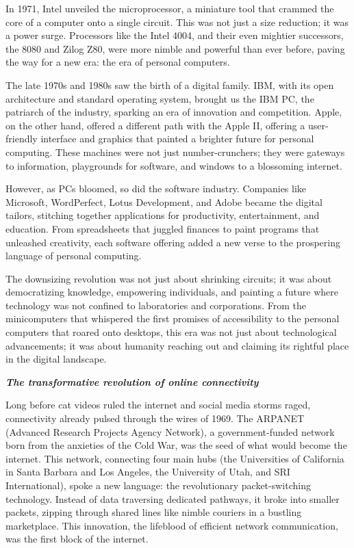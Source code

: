 \documentclass[
  letterpaper,
  DIV=11,
  numbers=noendperiod]{scrreprt}
\begin{document}
In 1971, Intel unveiled the microprocessor, a miniature tool that
crammed the core of a computer onto a single circuit. This was not just
a size reduction; it was a power surge. Processors like the Intel 4004,
and their even mightier successors, the 8080 and Zilog Z80, were more
nimble and powerful than ever before, paving the way for a new era: the
era of personal computers.

The late 1970s and 1980s saw the birth of a digital family. IBM, with
its open architecture and standard operating system, brought us the IBM
PC, the patriarch of the industry, sparking an era of innovation and
competition. Apple, on the other hand, offered a different path with the
Apple II, offering a user-friendly interface and graphics that painted a
brighter future for personal computing. These machines were not just
number-crunchers; they were gateways to information, playgrounds for
software, and windows to a blossoming internet.

However, as PCs bloomed, so did the software industry. Companies like
Microsoft, WordPerfect, Lotus Development, and Adobe became the digital
tailors, stitching together applications for productivity,
entertainment, and education. From spreadsheets that juggled finances to
paint programs that unleashed creativity, each software offering added a
new verse to the prospering language of personal computing.

The downsizing revolution was not just about shrinking circuits; it was
about democratizing knowledge, empowering individuals, and painting a
future where technology was not confined to laboratories and
corporations. From the minicomputers that whispered the first promises
of accessibility to the personal computers that roared onto desktops,
this era was not just about technological advancements; it was about
humanity reaching out and claiming its rightful place in the digital
landscape.

\textbf{\emph{The transformative revolution of online connectivity}}

Long before cat videos ruled the internet and social media storms raged,
connectivity already pulsed through the wires of 1969. The ARPANET
(Advanced Research Projects Agency Network), a government-funded network
born from the anxieties of the Cold War, was the seed of what would
become the internet. This network, connecting four main hubs (the
Universities of California in Santa Barbara and Los Angeles, the
University of Utah, and SRI International), spoke a new language: the
revolutionary packet-switching technology. Instead of data traversing
dedicated pathways, it broke into smaller packets, zipping through
shared lines like nimble couriers in a bustling marketplace. This
innovation, the lifeblood of efficient network communication, was the
first block of the internet.
\end{document}
